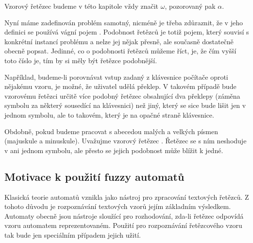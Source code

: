 \documentclass[a4paper,10pt]{article}
\begin{document}
\begin{note}
 Vzorový řetězec budeme v této kapitole vždy značit $\omega$, pozorovaný pak $\alpha$.
\end{note}

Nyní máme zadefinován problém samotný, nicméně je třeba zdůraznit, že v jeho definici se používá vágní pojem . Podobnost řetězců je totiž pojem, který souvisí s konkrétní instancí problému a nelze jej nějak přesně, ale současně dostatečně obecně popsat. Jedinné, co o podobnosti řetězců můžeme říct, je, že čím vyšší toto číslo je, tím by si měly být řetězce podobnější.

Například, budeme-li porovnávat vstup zadaný z klávesnice počítače oproti nějakému vzoru, je možné, že uživatel udělá překlep. V takovém případě bude vzorovému řetězci určitě více podobný řetězec obsahující dva překlepy (záměna symbolu za některý sousedící na klávesnici) než jiný, který se sice bude lišit jen v jednom symbolu, ale to takovém, který je na opačné straně klávesnice.

Obdobně, pokud budeme pracovat s abecedou malých a velkých písmen (majuskule a minuskule). Uvažujme vzorový řetězec . Řetězec  se s ním neshoduje v ani jednom symbolu, ale přesto se jejich podobnost může blížit k jedné.


\subsection{Motivace k použití fuzzy automatů}
Klasická teorie automatů vznikla jako nástroj pro zpracování textových řetězců. Z tohoto důvodu je rozpoznávání textových vzorů jejím základním výsledkem. Automaty obecně jsou nástroje sloužící pro rozhodování, zda-li řetězec odpovídá vzoru automatem reprezentovaném. Použití pro rozpoznávání řetězcového vzoru tak bude jen speciálním případem jejich užití.
\end{document}
